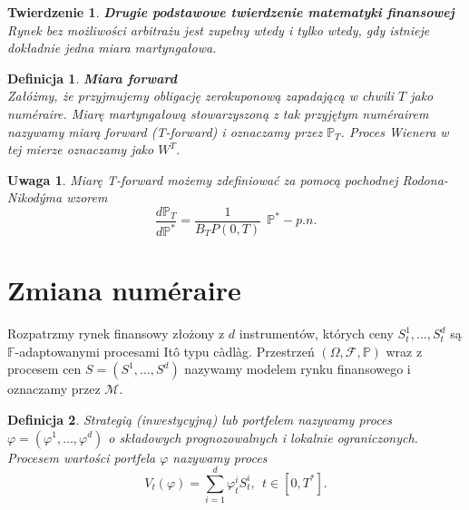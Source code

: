 \documentclass{mini}
\theoremstyle{mythstyle}
\newtheorem{Twierdzenie}{Twierdzenie}[chapter]
\newtheorem{Definicja}{Definicja}[chapter]
\newtheorem{Uwaga}{Uwaga}[chapter]
\begin{document}
\begin{Twierdzenie}
	\textbf{Drugie podstawowe twierdzenie matematyki finansowej}\\
	Rynek bez możliwości arbitrażu jest zupełny wtedy i tylko wtedy, gdy istnieje dokładnie jedna miara martyngałowa.\\
\end{Twierdzenie}
\begin{Definicja}
	\textbf{Miara forward}\\
	Załóżmy, że przyjmujemy obligację zerokuponową zapadającą w chwili $T$ jako num\'{e}raire. Miarę martyngałową stowarzyszoną z tak przyjętym num\'{e}rairem nazywamy miarą forward (T-forward) i oznaczamy przez $\mathbb{P}_T$. Proces Wienera w tej mierze oznaczamy jako $W^T$.\\
\end{Definicja}
\begin{Uwaga}
	Miarę T-forward możemy zdefiniować za pomocą pochodnej Rodona-Nikod\'{y}ma wzorem
	\begin{equation*}
	\frac{d\mathbb{P}_T}{d\mathbb{P^*}} = \frac{1}{B_T P(0,T)} \   \ \mathbb{P^*}-p.n.
	\end{equation*}
\end{Uwaga}

\section{Zmiana num\'{e}raire}

	Rozpatrzmy rynek finansowy złożony z $d$ instrumentów, których ceny $S_t^1,\ldots,S_t^d$ są $\mathbb{F}$-adaptowanymi procesami It\^{o} typu c\`{a}dl\`{a}g. Przestrzeń $(\Omega,\mathcal{F}, \mathbb{P})$ wraz z procesem cen $S=(S^1,\ldots,S^d)$ nazywamy modelem rynku finansowego i oznaczamy przez $\mathcal{M}$.\\
	\begin{Definicja}
	Strategią (inwestycyjną) lub portfelem nazywamy proces $\varphi=(\varphi^1,\ldots,\varphi^d)$ o składowych prognozowalnych i lokalnie ograniczonych. Procesem wartości portfela $\varphi$ nazywamy proces \[ V_t(\varphi)=\sum_{i=1}^d\varphi_t^iS_t^i, \ \ t\in[0,T^*]. \]
\end{Definicja}
\end{document}
